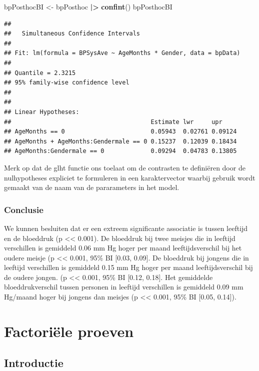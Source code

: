 \documentclass[
  12pt,dutch]{book}
\newenvironment{Shaded}{\begin{snugshade}}{\end{snugshade}}
\newcommand{\FunctionTok}[1]{\textcolor[rgb]{0.13,0.29,0.53}{\textbf{#1}}}
\newcommand{\NormalTok}[1]{#1}
\newcommand{\OtherTok}[1]{\textcolor[rgb]{0.56,0.35,0.01}{#1}}
\newcommand{\SpecialCharTok}[1]{\textcolor[rgb]{0.81,0.36,0.00}{\textbf{#1}}}
\theoremstyle{definition}
\theoremstyle{definition}
\theoremstyle{definition}
\theoremstyle{definition}
\theoremstyle{remark}
\begin{document}
\begin{Shaded}
\begin{Highlighting}[]
\NormalTok{bpPosthocBI }\OtherTok{\textless{}{-}}\NormalTok{ bpPosthoc }\SpecialCharTok{|\textgreater{}}
    \FunctionTok{confint}\NormalTok{()}
\NormalTok{bpPosthocBI}
\end{Highlighting}
\end{Shaded}

\begin{verbatim}
## 
##   Simultaneous Confidence Intervals
## 
## Fit: lm(formula = BPSysAve ~ AgeMonths * Gender, data = bpData)
## 
## Quantile = 2.3215
## 95% family-wise confidence level
##  
## 
## Linear Hypotheses:
##                                       Estimate lwr     upr    
## AgeMonths == 0                        0.05943  0.02761 0.09124
## AgeMonths + AgeMonths:Gendermale == 0 0.15237  0.12039 0.18434
## AgeMonths:Gendermale == 0             0.09294  0.04783 0.13805
\end{verbatim}

Merk op dat de glht functie ons toelaat om de contrasten te definiëren door de nulhypotheses expliciet te formuleren in een karaktervector waarbij gebruik wordt gemaakt van de naam van de pararameters in het model.

\subsubsection{Conclusie}\label{conclusie-2}

We kunnen besluiten dat er een extreem significante associatie is tussen leeftijd en de bloeddruk (p \textless\textless{} 0.001).
De bloeddruk bij twee meisjes die in leeftijd verschillen is gemiddeld 0.06 mm Hg hoger per maand leeftijdsverschil bij het oudere meisje (p \textless\textless{} 0.001, 95\% BI {[}0.03, 0.09{]}.
De bloeddruk bij jongens die in leeftijd verschillen is gemiddeld 0.15 mm Hg hoger per maand leeftijdsverschil bij de oudere jongen. (p \textless\textless{} 0.001, 95\% BI {[}0.12, 0.18{]}.
Het gemiddelde bloeddrukverschil tussen personen in leeftijd verschillen is gemiddeld 0.09 mm Hg/maand hoger bij jongens dan meisjes (p \textless\textless{} 0.001, 95\% BI {[}0.05, 0.14{]}).

\section{Factoriële proeven}\label{factoriuxeble-proeven}

\subsection{Introductie}\label{introductie}
\end{document}
